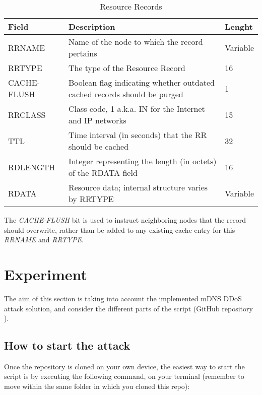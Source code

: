 \documentclass[fleqn, 10pt]{SelfArx} %
\begin{document}
\begin{table}[hbt]
	\centering
	\begin{tabular}{|C{1.7cm}|C{4.2cm}|C{1cm}|}
		\hline
		Field & Description & Lenght \\
		\hline
		\hline
		RRNAME & Name of the node to which the record pertains & Variable\\
		\hline
		RRTYPE & The type of the Resource Record & 16\\
		\hline
		CACHE-FLUSH & Boolean flag indicating whether outdated cached records should be purged & 1\\
		\hline
		RRCLASS & Class code, 1 a.k.a. IN for the Internet and IP networks & 15\\
		\hline
		TTL & Time interval (in seconds) that the RR should be cached & 32\\
		\hline
		RDLENGTH & Integer representing the length (in octets) of the RDATA field & 16\\
		\hline
		RDATA & Resource data; internal structure varies by RRTYPE & Variable\\
		\hline
	\end{tabular}
	\caption{Resource Records}
	 \label{table} %
\end{table}

The {\it{CACHE-FLUSH}} bit is used to instruct neighboring nodes that the record should overwrite, rather than be added to any existing cache entry for this {\it{RRNAME}} and {\it{RRTYPE}}.


\section{Experiment}
The aim of this section is taking into account the implemented mDNS DDoS attack solution, and consider the different parts of the script
(GitHub repository \cite{repo}).

\subsection{How to start the attack}
Once the repository is cloned on your own device, the easiest way to start the script is by executing the following command, on your terminal (remember to move within the same folder
in which you cloned this repo):
\end{document}

